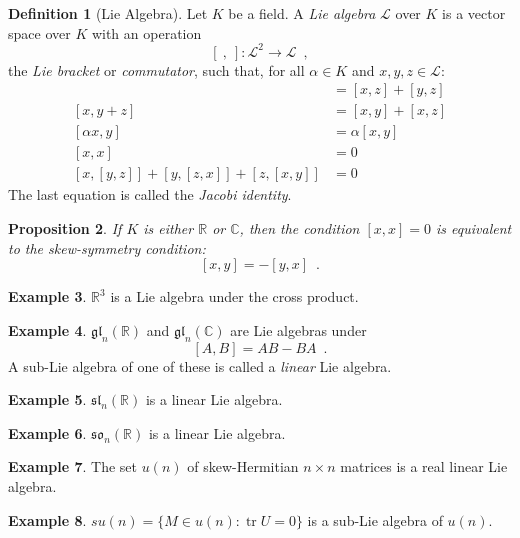 \documentclass{book}
\newtheorem{prop}{Proposition}[chapter]
\theoremstyle{definition}
\newtheorem{df}[prop]{Definition}
\newtheorem{ex}[prop]{Example}
\newcommand{\gl}[2]{\ensuremath{\mathfrak{gl}_{#1} \left( {#2} \right)}}
\renewcommand{\sl}[2]{\ensuremath{\mathfrak{sl}_{#1} \left( {#2} \right)}}
\newcommand{\so}[2]{\ensuremath{\mathfrak{so}_{#1} \left( {#2} \right)}}
\newcommand{\tr}{\ensuremath{\operatorname{tr}}}
\begin{document}
\begin{df}[Lie Algebra]
Let $K$ be a field. A \emph{Lie algebra} $\mathcal{L}$ over $K$ is a vector space over $K$ with an operation
\[ [\ ,\ ] : \mathcal{L}^2 \rightarrow \mathcal{L} \enspace , \]
the \emph{Lie bracket} or \emph{commutator}, such that, for all $\alpha \in K$ and $x,y,z \in \mathcal{L}$:
\begin{align*}
[x+y,z] & = [x,z] + [y,z] \\
[x,y+z] & = [x,y] + [x,z] \\
[\alpha x,y] & = \alpha [x,y] \\
[x,x] & = 0 \\
[x,[y,z]] + [y,[z,x]] + [z,[x,y]] & = 0
\end{align*}
The last equation is called the \emph{Jacobi identity}.
\end{df}

\begin{prop}
If $K$ is either $\mathbb{R}$ or $\mathbb{C}$, then the condition $[x,x] = 0$ is equivalent to the \emph{skew-symmetry condition}:
\[ [x,y] = -[y,x] \enspace . \]
\end{prop}


\begin{ex}
$\mathbb{R}^3$ is a Lie algebra under the cross product.
\end{ex}

\begin{ex}
$\gl
{n}{\mathbb{R}}$ and $\gl{n}{\mathbb{C}}$ are Lie algebras under
\[ [A,B] = AB - BA \enspace . \]
A sub-Lie algebra of one of these is called a \emph{linear} Lie algebra.
\end{ex}

\begin{ex}
$\sl{n}{\mathbb{R}}$ is a linear Lie algebra.
\end{ex}

\begin{ex}
$\so{n}{\mathbb{R}}$ is a linear Lie algebra.
\end{ex}

\begin{ex}
The set $u(n)$ of skew-Hermitian $n \times n$ matrices is a real linear Lie algebra.
\end{ex}

\begin{ex}
$su(n) = \{ M \in u(n) : \tr U = 0 \}$ is a sub-Lie algebra of $u(n)$.
\end{ex}
\end{document}
